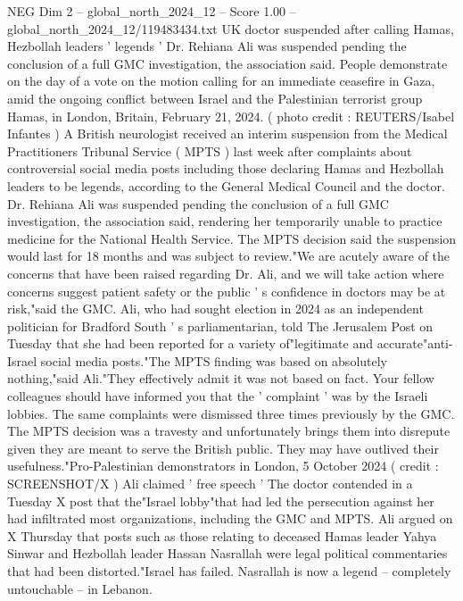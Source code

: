 \begin{textsample}{NEG Dim 2 – global\_north\_2024\_12 – Score 1.00 – global\_north\_2024\_12/119483434.txt}  \label{ex:f2_neg_168}
UK doctor suspended after calling Hamas, Hezbollah leaders ' legends ' Dr.
Rehiana Ali was suspended pending the conclusion of a full GMC investigation, the association said.
People demonstrate on the day of a vote on the motion calling for an immediate ceasefire in Gaza, amid the ongoing conflict between Israel and the Palestinian terrorist group Hamas, in London, Britain, February 21, 2024. ( photo credit : REUTERS/Isabel Infantes ) A British neurologist received an interim suspension from the Medical Practitioners Tribunal Service ( MPTS ) last week after complaints about controversial social media posts including those declaring Hamas and Hezbollah leaders to be legends, according to the General Medical Council and the doctor.
Dr.
Rehiana Ali was suspended pending the conclusion of a full GMC investigation, the association said, rendering her temporarily unable to practice medicine for the National Health Service.
The MPTS decision said the suspension would last for 18 months and was subject to review."We are acutely aware of the concerns that have been raised regarding Dr.
Ali, and we will take action where concerns suggest patient safety or the public ' s confidence in doctors may be at risk,"said the GMC.
Ali, who had sought election in 2024 as an independent politician for Bradford South ' s parliamentarian, told The Jerusalem Post on Tuesday that she had been reported for a variety of"legitimate and accurate"anti-Israel social media posts."The MPTS finding was based on absolutely nothing,"said Ali."They effectively admit it was not based on fact.
Your fellow colleagues should have informed you that the ' complaint ' was by the Israeli lobbies.
The same complaints were dismissed three times previously by the GMC.
The MPTS decision was a travesty and unfortunately brings them into disrepute given they are meant to serve the British public.
They may have outlived their usefulness."Pro-Palestinian demonstrators in London, 5 October 2024 ( credit : SCREENSHOT/X ) Ali claimed ' free speech ' The doctor contended in a Tuesday X post that the"Israel lobby"that had led the persecution against her had infiltrated most organizations, including the GMC and MPTS.
Ali argued on X Thursday that posts such as those relating to deceased Hamas leader Yahya Sinwar and Hezbollah leader Hassan Nasrallah were legal political commentaries that had been distorted."Israel has failed.
Nasrallah is now a legend -- completely untouchable -- in Lebanon.

\end{textsample}
